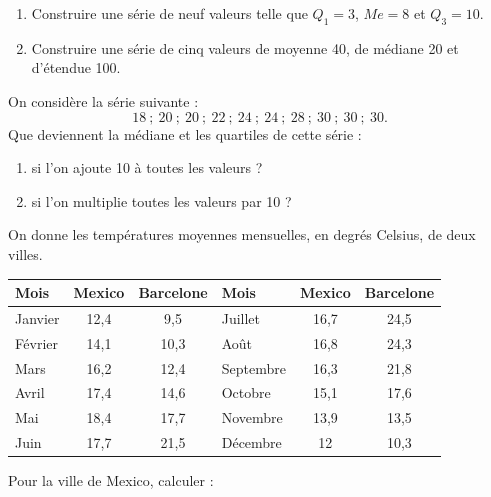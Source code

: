 \exo
   \begin{enumerate}
   \item Construire une série de neuf valeurs telle que $Q_1=3$, $Me=8$ et $Q_3=10$.
   \item Construire une série de cinq valeurs de moyenne 40, de médiane 20 et d'étendue 100. 
   \end{enumerate}
   
\exo
   On considère la série suivante :
   \[
   18\ ;\ 20\ ;\ 20\ ;\ 22\ ;\ 24\ ;\ 24\ ;\ 28\ ;\ 30\ ;\ 30\ ;\ 30.
   \]
   Que deviennent la médiane et les quartiles de cette série :
   \begin{enumerate}
   \item si l'on ajoute 10 à toutes les valeurs ?
   \item si l'on multiplie toutes les valeurs par 10 ?
   \end{enumerate}
   
\exo
   On donne les températures moyennes mensuelles, en degrés Celsius, de deux villes.

\begin{center}
\small
\renewcommand{\arraystretch}{0.95}
\setlength{\tabcolsep}{4pt}
\begin{tabular}{|l|c|c||l|c|c|}
     \hline
Mois & Mexico & Barcelone & Mois & Mexico & Barcelone \\
     \hline
Janvier & 12,4 & 9,5 & Juillet & 16,7 & 24,5 \\ \hline
Février & 14,1 & 10,3 & Août & 16,8 & 24,3 \\ \hline
Mars & 16,2 & 12,4 & Septembre & 16,3 & 21,8 \\ \hline
Avril & 17,4 & 14,6 & Octobre & 15,1 & 17,6 \\ \hline
Mai & 18,4 & 17,7 & Novembre & 13,9 & 13,5 \\ \hline
Juin & 17,7 & 21,5 & Décembre & 12 & 10,3 \\
     \hline
\end{tabular}
\end{center}
   
     Pour la ville de Mexico, calculer :
  
